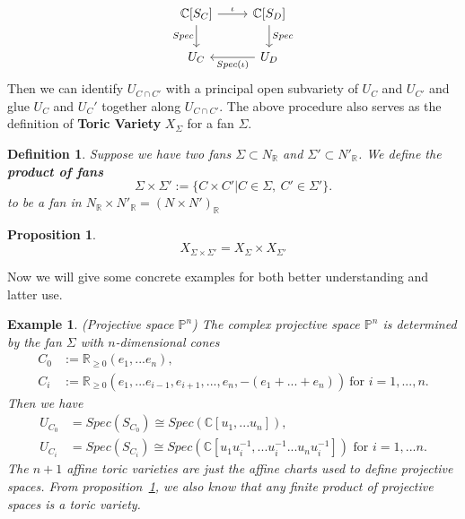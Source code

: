 \documentclass[11pt]{article}
\newtheorem{prop}[thm]{Proposition}
\newtheorem{dfn}[thm]{Definition}
\newtheorem{ex}[thm]{Example}
\renewcommand{\qedsymbol}{$\square$}
\begin{document}
\[ \begin{tikzcd}
\mathbb{C}[S_C] \arrow{r}{\iota} \arrow[swap]{d}{Spec} 
& \mathbb{C}[S_D] \arrow{d}{Spec} \\%
U_C & U_D\arrow{l}{Spec(\iota)}
\end{tikzcd}
\]
Then we can identify $U_{C\cap C'}$ with a principal open subvariety of $U_{C}$ and $U_{C'}$ and glue $U_C$ and $U_C'$ together along $U_{C\cap C'}$. The above procedure also serves as the definition of \textbf{Toric Variety} $X_{\Sigma}$ for a fan $\Sigma$.

\begin{dfn}
	Suppose we have two fans $\Sigma\subset N_{\mathbb{R}}$ and $\Sigma'\subset N'_{\mathbb{R}}$. We define the \textbf{product of fans}
	$$
		\Sigma\times \Sigma':=\{C\times C'|C\in\Sigma,\ C'\in \Sigma'\}.
	$$
	to be a fan in $N_{\mathbb{R}}\times N'_{\mathbb{R}}=(N\times N')_{\mathbb{R}}$
\end{dfn}

\begin{prop}\label{products}
$$
	X_{\Sigma\times \Sigma'}=X_{\Sigma}\times X_{\Sigma'}
$$
\flushright{\qedsymbol}
\end{prop}


Now we will give some concrete examples for both better understanding and latter use.
\begin{ex}\label{Pn}
	(Projective space $\mathbb{P}^n$) The complex projective space $\mathbb{P}^n$ is determined by the fan $\Sigma$ with $n$-dimensional cones
	\begin{equation*}
	\begin{aligned}
		C_0 & :=\mathbb{R}_{\geq 0}(e_1,...e_n),\\
		C_i & :=\mathbb{R}_{\geq 0}(e_1,...e_{i-1},e_{i+1},...,e_n,-(e_1+...+e_n))\ \text{for } i=1,...,n.
	\end{aligned}
	\end{equation*}
	Then we have
	$$
	\begin{aligned}
		U_{C_0} & =Spec(S_{C_0})\cong Spec(\mathbb{C}[u_1,...u_n]),\\
		U_{C_i} & =Spec(S_{C_i})\cong Spec(\mathbb{C}[u_1 u_i^{-1},...u_i^{-1}...u_n u_i^{-1}]) \text{ for } i=1,...n.
	\end{aligned}
	$$
 	The $n+1$ affine toric varieties are just the affine charts used to define projective spaces. From proposition~\ref{products}, we also know that any finite product of projective spaces is a toric variety.
\end{ex}
\end{document}
